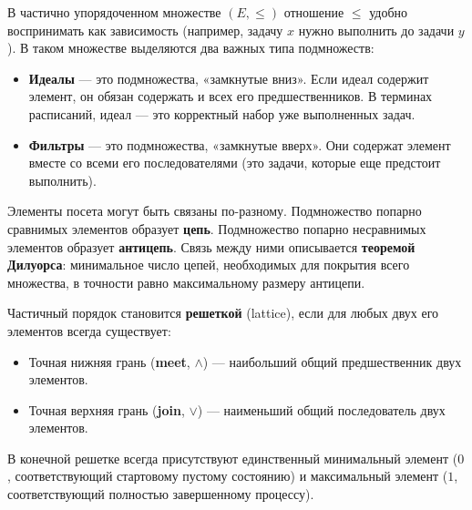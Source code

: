 В частично упорядоченном множестве $(E, \leq)$ отношение $\leq$ удобно воспринимать как зависимость (например, задачу $x$ нужно выполнить до задачи $y$). В таком множестве выделяются два важных типа подмножеств:
\begin{itemize}
    \item \textbf{Идеалы} — это подмножества, «замкнутые вниз». Если идеал содержит элемент, он обязан содержать и всех его предшественников. В терминах расписаний, идеал — это корректный набор уже выполненных задач.
    \item \textbf{Фильтры} — это подмножества, «замкнутые вверх». Они содержат элемент вместе со всеми его последователями (это задачи, которые еще предстоит выполнить).
\end{itemize}

Элементы посета могут быть связаны по-разному. Подмножество попарно сравнимых элементов образует \textbf{цепь}. Подмножество попарно несравнимых элементов образует \textbf{антицепь}. Связь между ними описывается \textbf{теоремой Дилуорса}: минимальное число цепей, необходимых для покрытия всего множества, в точности равно максимальному размеру антицепи.

Частичный порядок становится \textbf{решеткой} (lattice), если для любых двух его элементов всегда существует:
\begin{itemize}
    \item Точная нижняя грань (\textbf{meet}, $\wedge$) — наибольший общий предшественник двух элементов.
    \item Точная верхняя грань (\textbf{join}, $\vee$) — наименьший общий последователь двух элементов.
\end{itemize}
В конечной решетке всегда присутствуют единственный минимальный элемент ($0$, соответствующий стартовому пустому состоянию) и максимальный элемент ($1$, соответствующий полностью завершенному процессу).


